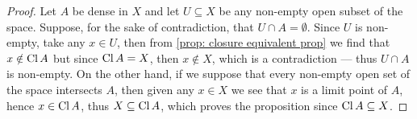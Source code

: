 \begin{proof}
    Let \(A\) be dense in \(X\) and let \(U \subseteq X\) be any non-empty
    open subset of the space. Suppose, for the sake of contradiction, that \(U \cap
    A = \emptyset\). Since \(U\) is non-empty, take any \(x \in U\), then from
    \cref{prop: closure equivalent prop} we find that \(x \notin \operatorname{Cl} A\) but
    since \(\operatorname{Cl} A = X\), then \(x \notin X\), which is a contradiction ---
    thus \(U \cap A\) is non-empty. On the other hand, if we suppose that every
    non-empty open set of the space intersects \(A\), then given any \(x \in X\) we
    see that \(x\) is a limit point of \(A\), hence \(x \in \operatorname{Cl} A\), thus \(X
    \subseteq \operatorname{Cl} A\), which proves the proposition since \(\operatorname{Cl} A
    \subseteq X\).
\end{proof}


